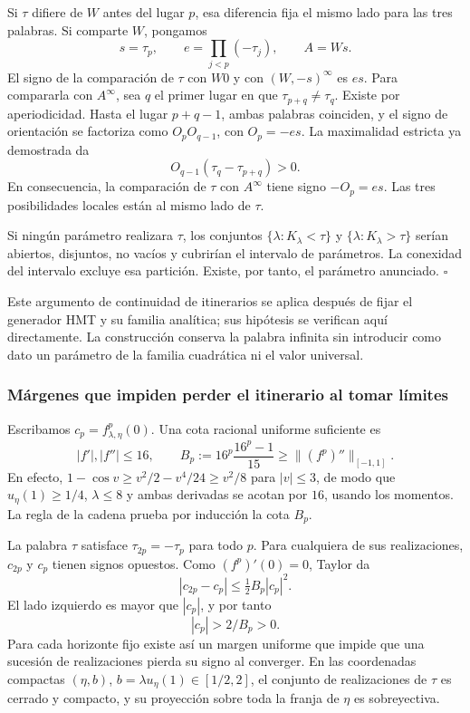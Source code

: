 Si \(\tau\) difiere de \(W\) antes del lugar \(p\), esa diferencia fija el mismo lado para las tres palabras. Si comparte \(W\), pongamos
\[
s=\tau_p,\qquad e=\prod_{j<p}(-\tau_j),\qquad A=Ws.
\]
El signo de la comparación de \(\tau\) con \(W0\) y con \((W,-s)^\infty\) es \(es\). Para compararla con \(A^\infty\), sea \(q\) el primer lugar en que \(\tau_{p+q}\ne\tau_q\). Existe por aperiodicidad. Hasta el lugar \(p+q-1\), ambas palabras coinciden, y el signo de orientación se factoriza como \(O_pO_{q-1}\), con \(O_p=-es\). La maximalidad estricta ya demostrada da
\[
O_{q-1}(\tau_q-\tau_{p+q})>0.
\]
En consecuencia, la comparación de \(\tau\) con \(A^\infty\) tiene signo \(-O_p=es\). Las tres posibilidades locales están al mismo lado de \(\tau\).

Si ningún parámetro realizara \(\tau\), los conjuntos \(\{\lambda:K_\lambda<\tau\}\) y \(\{\lambda:K_\lambda>\tau\}\) serían abiertos, disjuntos, no vacíos y cubrirían el intervalo de parámetros. La conexidad del intervalo excluye esa partición. Existe, por tanto, el parámetro anunciado. \(\square\)

Este argumento de continuidad de itinerarios se aplica después de fijar el generador HMT y su familia analítica; sus hipótesis se verifican aquí directamente. La construcción conserva la palabra infinita sin introducir como dato un parámetro de la familia cuadrática ni el valor universal.

\subsubsection{Márgenes que impiden perder el itinerario al tomar límites}
\label{hmtfg:prolongacion:6.2}

Escribamos \(c_p=f_{\lambda,\eta}^p(0)\). Una cota racional uniforme suficiente es
\[
|f'|,|f''|\le16,\qquad
B_p:=16^p\frac{16^p-1}{15}\ge\|(f^p)''\|_{[-1,1]}.
\]
En efecto, \(1-\cos v\ge v^2/2-v^4/24\ge v^2/8\) para \(|v|\le3\), de modo que \(u_\eta(1)\ge1/4\), \(\lambda\le8\) y ambas derivadas se acotan por \(16\), usando los momentos. La regla de la cadena prueba por inducción la cota \(B_p\).

La palabra \(\tau\) satisface \(\tau_{2p}=-\tau_p\) para todo \(p\). Para cualquiera de sus realizaciones, \(c_{2p}\) y \(c_p\) tienen signos opuestos. Como \((f^p)'(0)=0\), Taylor da
\[
|c_{2p}-c_p|\le\tfrac12B_p|c_p|^2.
\]
El lado izquierdo es mayor que \(|c_p|\), y por tanto
\[
\boxed{|c_p|>2/B_p>0.}
\]
Para cada horizonte fijo existe así un margen uniforme que impide que una sucesión de realizaciones pierda su signo al converger. En las coordenadas compactas \((\eta,b)\), \(b=\lambda u_\eta(1)\in[1/2,2]\), el conjunto de realizaciones de \(\tau\) es cerrado y compacto, y su proyección sobre toda la franja de \(\eta\) es sobreyectiva.

